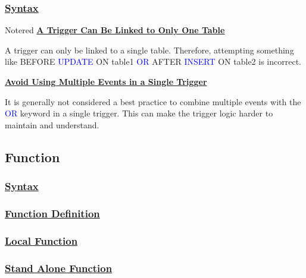 \subsubsection*{\underline{Syntax}}






\begin{prettyBox}{Note}{red}
\textbf{\underline{A Trigger Can Be Linked to Only One Table}}

\vspace{0.15cm}
A trigger can only be linked to a single table. Therefore, attempting something like 
BEFORE \textcolor{blue}{UPDATE} ON table1 \textcolor{blue}{OR} AFTER \textcolor{blue}{INSERT} ON table2 is incorrect.

\vspace{0.25cm}

\textbf{\underline{Avoid Using Multiple Events in a Single Trigger}}

\vspace{0.15cm}
It is generally not considered a best practice to combine multiple events with the \textcolor{blue}{OR} keyword in a single trigger. This can make the trigger logic harder to maintain and understand.
\end{prettyBox}

\vspace{0.5cm}
\subsection{Function}


\subsubsection*{\underline{Syntax}}

\subsubsection*{\underline{Function Definition}}

\subsubsection*{\underline{Local Function}}




\newpage

\subsubsection*{\underline{Stand Alone Function}}

